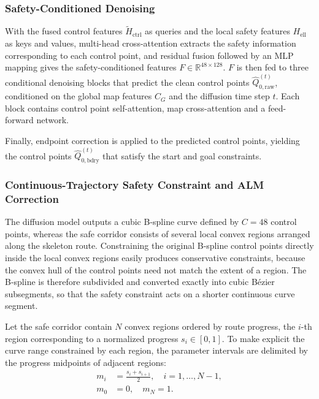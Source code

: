 \documentclass[journal]{IEEEtran}
\newcommand{\R}{\mathbb{R}}
\newcommand{\ctrlf}{\widetilde{H}_{\mathrm{ctrl}}}
\newcommand{\hell}{H_{\mathrm{ell}}}
\newcommand{\Qraw}{\widehat{Q}_{0,\mathrm{raw}}^{(t)}}
\newcommand{\Qbdry}{\widehat{Q}_{0,\mathrm{bdry}}^{(t)}}
\begin{document}
\subsubsection{Safety-Conditioned Denoising}
With the fused control features $\ctrlf$ as queries and the local safety
features $\hell$ as keys and values, multi-head cross-attention extracts the
safety information corresponding to each control point, and residual fusion
followed by an MLP mapping gives the safety-conditioned features
$F\in\R^{48\times128}$. $F$ is then fed to three conditional denoising blocks
that predict the clean control points $\Qraw$, conditioned on the global map
features $C_G$ and the diffusion time step $t$. Each block contains control
point self-attention, map cross-attention and a feed-forward network.

Finally, endpoint correction is applied to the predicted control points,
yielding the control points $\Qbdry$ that satisfy the start and goal
constraints.

\subsubsection{Continuous-Trajectory Safety Constraint and ALM Correction}
The diffusion model outputs a cubic B-spline curve defined by $C=48$ control
points, whereas the safe corridor consists of several local convex regions
arranged along the skeleton route. Constraining the original B-spline control
points directly inside the local convex regions easily produces conservative
constraints, because the convex hull of the control points need not match the
extent of a region. The B-spline is therefore subdivided and converted exactly
into cubic B\'ezier subsegments, so that the safety constraint acts on a
shorter continuous curve segment.

Let the safe corridor contain $N$ convex regions ordered by route progress, the
$i$-th region corresponding to a normalized progress $s_i\in[0,1]$. To make
explicit the curve range constrained by each region, the parameter intervals
are delimited by the progress midpoints of adjacent regions:
\begin{equation}
\begin{aligned}
m_i&=\frac{s_i+s_{i+1}}{2},\quad i=1,\ldots,N-1,\\
m_0&=0,\quad m_N=1.
\end{aligned}
\end{equation}
\end{document}
